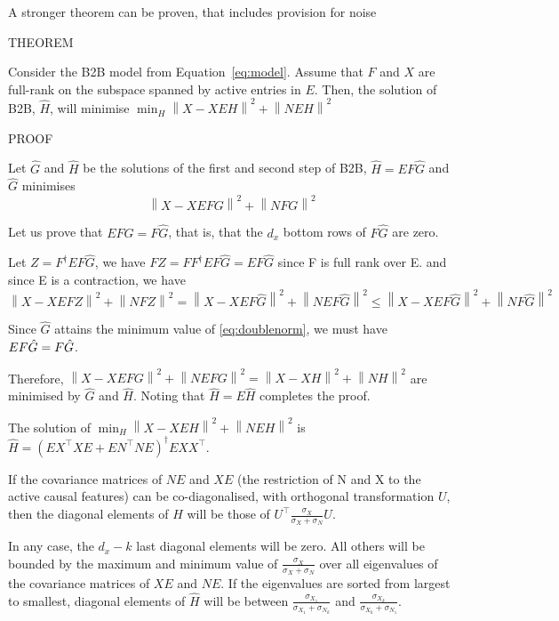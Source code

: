 \documentclass{article}
\begin{document}
\clearpage
\newpage
A stronger theorem can be proven, that includes provision for noise


THEOREM

    Consider the B2B model from Equation~\ref{eq:model}.
    Assume that $F$ and $X$ are full-rank on the subspace spanned by active entries in $E$.
    Then, the solution of B2B, $\hat H$, will minimise 
    $\min_H  \left \| X - XEH\right\| ^2  + \left \| NEH\right \| ^2$

PROOF

Let $\hat G$ and $\hat H$ be the solutions of the first and second step of B2B, $\hat H=EF\hat G$ and $\hat G$ minimises 
\begin{equation}
	\left \| X - XEFG\right\| ^2  + \left \| NFG\right \| ^2
    \label{eq:doublenorm}
\end{equation}

Let us prove that $EF\hat G = F\hat G$, that is, that the $d_x$ bottom rows of $F\hat G$ are zero. 

Let $Z=F^\dagger EF\hat G$, we have $FZ = FF^\dagger EF  \hat G= EF\hat G$ since F is full rank over E. and since E is a contraction, we have 
$$\left \| X - XEFZ\right \| ^2  + \left \| NFZ\right \| ^2 = \left \| X - XEF\hat G\right \| ^2  + \left \| NEF\hat G\right \| ^2 \leq \left \| X - XEF\hat G\right \| ^2  + \left \| NF\hat G\right \| ^2$$

Since $\hat G$ attains the minimum value of \ref{eq:doublenorm}, we must have $EF\hat G = F\Hat G$.

Therefore, $\left \| X - XEFG\right \| ^2  + \left \| NEFG\right \| ^2 = \left \| X - XH\right \| ^2  + \left \| NH\right \| ^2$ are minimised by $\hat G$ and $\hat H$. Noting that $\hat H = E\hat H$ completes the proof.

The solution of $\min_H  \left \| X - XEH\right\| ^2  + \left \| NEH\right \| ^2$ is $\hat H= (E X^\top XE +EN^\top NE) ^\dagger EXX^\top$. 

If the covariance matrices of $NE$ and $XE$ (the restriction of N and X to the active causal features) can be co-diagonalised, with orthogonal transformation $U$, then the diagonal elements of $\hat H$ will be those of $U^\top  \frac{\sigma_X}{\sigma_X + \sigma_N} U $. 

In any case, the $d_x-k$ last diagonal elements will be zero. All others will be bounded by the maximum and minimum value of $\frac{\sigma_X}{\sigma_X + \sigma_N}$ over all eigenvalues of the covariance matrices of $XE$ and $NE$. If the eigenvalues are sorted from largest to smallest, diagonal elements of $\hat H$ will be between $\frac{\sigma_{X_1}}{\sigma_{X_1} +\sigma_{N_k}}$ and $\frac{\sigma_{X_k}}{\sigma_{X_k} +\sigma_{N_1}}$.
\end{document}
